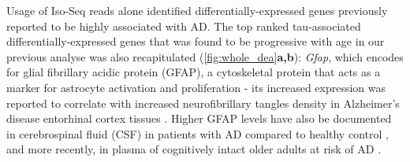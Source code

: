 Usage of Iso-Seq reads alone identified differentially-expressed genes previously reported to be highly associated with AD. The top ranked tau-associated differentially-expressed genes that was found to be progressive with age in our previous analyse\cite{Castanho2020} was also recapitulated (\cref{fig:whole_dea}\textbf{a,b}): \textit{Gfap}, which encodes for glial fibrillary acidic protein (GFAP), a cytoskeletal protein that acts as a marker for astrocyte activation and proliferation - its increased expression was reported to correlate with increased neurofibrillary tangles density in Alzheimer's disease entorhinal cortex tissues \cite{Muramori1998}. Higher GFAP levels have also be documented in cerebrospinal fluid (CSF) in patients with AD compared to healthy control \cite{Ishiki2016}, and more recently, in plasma of cognitively intact older adults at risk of AD \cite{Chatterjee2021}. 


